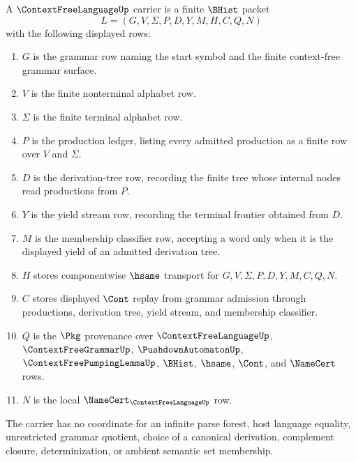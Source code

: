 \begin{definition}
\label{def:context-free-language-carrier}
A $\ContextFreeLanguageUp$ carrier is a finite $\BHist$ packet
$$
L=(G,V,\Sigma,P,D,Y,M,H,C,Q,N)
$$
with the following displayed rows:
\begin{enumerate}
\item $G$ is the grammar row naming the start symbol and the finite context-free grammar surface.
\item $V$ is the finite nonterminal alphabet row.
\item $\Sigma$ is the finite terminal alphabet row.
\item $P$ is the production ledger, listing every admitted production as a finite row over $V$ and $\Sigma$.
\item $D$ is the derivation-tree row, recording the finite tree whose internal nodes read productions from $P$.
\item $Y$ is the yield stream row, recording the terminal frontier obtained from $D$.
\item $M$ is the membership classifier row, accepting a word only when it is the displayed yield of an admitted derivation tree.
\item $H$ stores componentwise $\hsame$ transport for $G,V,\Sigma,P,D,Y,M,C,Q,N$.
\item $C$ stores displayed $\Cont$ replay from grammar admission through productions, derivation tree, yield stream, and membership classifier.
\item $Q$ is the $\Pkg$ provenance over $\ContextFreeLanguageUp$, $\ContextFreeGrammarUp$, $\PushdownAutomatonUp$, $\ContextFreePumpingLemmaUp$, $\BHist$, $\hsame$, $\Cont$, and $\NameCert$ rows.
\item $N$ is the local $\NameCert_{\ContextFreeLanguageUp}$ row.
\end{enumerate}
The carrier has no coordinate for an infinite parse forest, host language equality, unrestricted grammar quotient, choice of a canonical derivation, complement closure, determinization, or ambient semantic set membership.
\end{definition}

